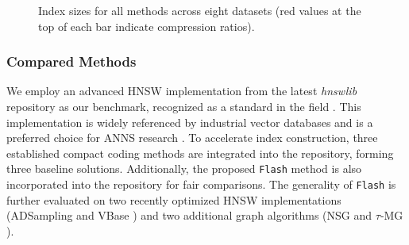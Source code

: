 \begin{figure*}
  \setlength{\abovecaptionskip}{0cm}
  \setlength{\belowcaptionskip}{0cm}
  \centering
  \footnotesize
  \hspace{2cm}
  \newline
  \hspace{0.4cm}
  \hspace{0.4cm}
  \hspace{0.4cm}
  \newline
  \hspace{0.4cm}
  \hspace{0.4cm}
  \hspace{0.4cm}
  \newline
  \caption{Index sizes for all methods across eight datasets (red values at the top of each bar indicate compression ratios).}
  \label{fig: index size}
  \vspace{-0.3cm}
\end{figure*}

\subsubsection{\textbf{Compared Methods}}
We employ an advanced HNSW implementation from the latest \textit{hnswlib} repository \cite{hnswlib} as our benchmark, recognized as a standard in the field \cite{FosterK23, KhanAJ23}. This implementation is widely referenced by industrial vector databases \cite{SingleStore-V,hnsqlite,knowhere} and is a preferred choice for ANNS research \cite{ADSampling,PengZLJR23,IndykX23}. To accelerate index construction, three established compact coding methods are integrated into the repository, forming three baseline solutions. Additionally, the proposed \texttt{Flash} method is also incorporated into the repository for fair comparisons. {The generality of \texttt{Flash} is further evaluated on two recently optimized HNSW implementations (ADSampling \cite{ADSampling} and VBase \cite{zhang2023vbase}) and two additional graph algorithms (NSG \cite{NSG} and $\tau$-MG \cite{tau-MG}).}

